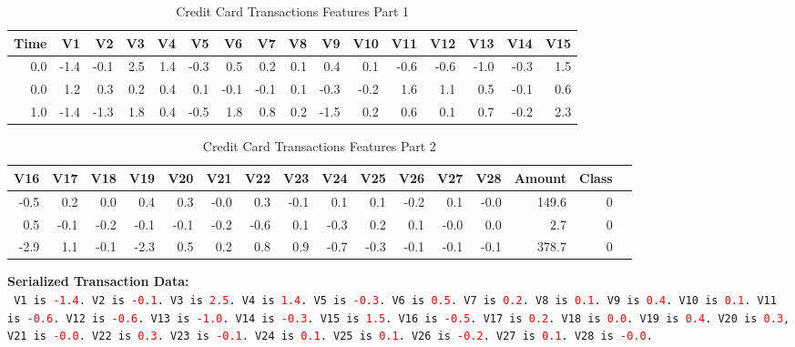 \documentclass{article}
\theoremstyle{plain}
\theoremstyle{definition}
\theoremstyle{remark}
\begin{document}
\begin{table}[h!]
\centering
\caption{Credit Card Transactions Features Part 1}
\begin{tabular}{rrrrrrrrrrrrrrrr}
\toprule
Time & V1 & V2 & V3 & V4 & V5 & V6 & V7 & V8 & V9 & V10 & V11 & V12 & V13 & V14 & V15 \\
\midrule
0.0 & -1.4 & -0.1 & 2.5 & 1.4 & -0.3 & 0.5 & 0.2 & 0.1 & 0.4 & 0.1 & -0.6 & -0.6 & -1.0 & -0.3 & 1.5 \\
0.0 & 1.2 & 0.3 & 0.2 & 0.4 & 0.1 & -0.1 & -0.1 & 0.1 & -0.3 & -0.2 & 1.6 & 1.1 & 0.5 & -0.1 & 0.6 \\
1.0 & -1.4 & -1.3 & 1.8 & 0.4 & -0.5 & 1.8 & 0.8 & 0.2 & -1.5 & 0.2 & 0.6 & 0.1 & 0.7 & -0.2 & 2.3 \\
\bottomrule
\end{tabular}
\end{table}

\begin{table}[h!]
\centering
\caption{Credit Card Transactions Features Part 2}
\begin{tabular}{rrrrrrrrrrrrrrrr}
\toprule
V16 & V17 & V18 & V19 & V20 & V21 & V22 & V23 & V24 & V25 & V26 & V27 & V28 & Amount & Class \\
\midrule
-0.5 & 0.2 & 0.0 & 0.4 & 0.3 & -0.0 & 0.3 & -0.1 & 0.1 & 0.1 & -0.2 & 0.1 & -0.0 & 149.6 & 0 \\
0.5 & -0.1 & -0.2 & -0.1 & -0.1 & -0.2 & -0.6 & 0.1 & -0.3 & 0.2 & 0.1 & -0.0 & 0.0 & 2.7 & 0 \\
-2.9 & 1.1 & -0.1 & -2.3 & 0.5 & 0.2 & 0.8 & 0.9 & -0.7 & -0.3 & -0.1 & -0.1 & -0.1 & 378.7 & 0 \\
\bottomrule
\end{tabular}
\end{table}

\begin{mdframed}
\textbf{Serialized Transaction Data:}\\
\texttt{%
V1 is \textcolor{red}{-1.4}. V2 is \textcolor{red}{-0.1}. V3 is \textcolor{red}{2.5}. V4 is \textcolor{red}{1.4}. V5 is \textcolor{red}{-0.3}. V6 is \textcolor{red}{0.5}. V7 is \textcolor{red}{0.2}. V8 is \textcolor{red}{0.1}. V9 is \textcolor{red}{0.4}. V10 is \textcolor{red}{0.1}. V11 is \textcolor{red}{-0.6}. V12 is \textcolor{red}{-0.6}. V13 is \textcolor{red}{-1.0}. V14 is \textcolor{red}{-0.3}. V15 is \textcolor{red}{1.5}.
V16 is \textcolor{red}{-0.5}. V17 is \textcolor{red}{0.2}. V18 is \textcolor{red}{0.0}. V19 is \textcolor{red}{0.4}. V20 is \textcolor{red}{0.3}, V21 is \textcolor{red}{-0.0}. V22 is \textcolor{red}{0.3}. V23 is \textcolor{red}{-0.1}. V24 is \textcolor{red}{0.1}. V25 is \textcolor{red}{0.1}. V26 is \textcolor{red}{-0.2}. V27 is \textcolor{red}{0.1}. V28 is \textcolor{red}{-0.0}.
}
\end{mdframed}
\end{document}
